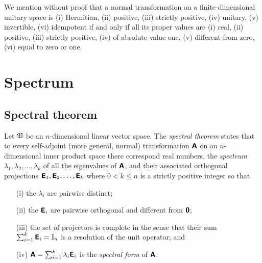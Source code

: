 We mention without proof that
a normal transformation on a finite-dimensional unitary space is
(i) Hermitian,
(ii) positive,
(iii) strictly positive,
(iv) unitary,
(v) invertible,
(vi) idempotent
if and only if all its proper values are
(i) real,
(ii) positive,
(iii) strictly positive,
(iv) of absolute value one,
(v) different from zero,
(vi) equal to zero or one.

\section{Spectrum}

\subsection{Spectral theorem}
\label{2012-m-ch-Spectraltheorem}

Let $\frak V$ be an $n$-dimensional linear vector space.
The {\em spectral theorem} states
that to every self-adjoint (more general, normal) transformation $ \textsf{\textbf{A}}$
on an $n$-dimensional inner product space there correspond real numbers, the {\em spectrum}
$
\lambda_1,
\lambda_2, \ldots ,
\lambda_k
$
of all the eigenvalues of   $ \textsf{\textbf{A}}$,
and their associated  orthogonal projections
$
\textsf{\textbf{E}}_1,
\textsf{\textbf{E}}_2, \ldots ,
\textsf{\textbf{E}}_k
$
where $0<k\le n$ is a strictly positive integer so that
\begin{itemize}
\item[(i)]
the $\lambda_i$ are pairwise distinct;
\item[(ii)]
the $\textsf{\textbf{E}}_i$ are pairwise orthogonal and different from $\textsf{\textbf{0}}$;
\item[(iii)]
the set of projectors is complete in the sense that their
sum $\sum_{i=1}^k \textsf{\textbf{E}}_i={\Bbb I}_n$
is a resolution of the unit operator; and
\item[(iv)]
$
\textsf{\textbf{A}}=\sum_{i=1}^k \lambda_i\textsf{\textbf{E}}_i
$
is the {\em spectral form} of $\textsf{\textbf{A}}$.
\end{itemize}


